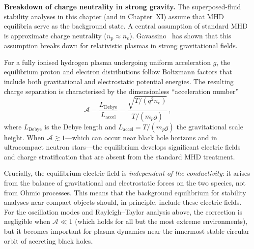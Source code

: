 \begin{relcorrection}
\textbf{Breakdown of charge neutrality in strong gravity.}
The superposed-fluid stability analyses in this chapter (and in
Chapter~XI) assume that MHD equilibria serve as the background state.
A central assumption of standard MHD is approximate charge neutrality
($n_p \approx n_e$).  Gavassino~\cite{GavassinoChargeSeparation2025}
has shown that this assumption breaks down for relativistic plasmas
in strong gravitational fields.

For a fully ionised hydrogen plasma undergoing uniform acceleration
$g$, the equilibrium proton and electron distributions follow
Boltzmann factors that include both gravitational and electrostatic
potential energies.  The resulting charge separation is characterised
by the dimensionless ``acceleration number''
\begin{equation}
  \mathscr{A} = \frac{L_{\mathrm{Debye}}}{L_{\mathrm{accel}}}
  = \frac{\sqrt{T/(q^2 n_e)}}{T/(m_p g)}\,,
  \label{eq:rel-10-accel-number}
\end{equation}
where $L_{\mathrm{Debye}}$ is the Debye length and
$L_{\mathrm{accel}} = T/(m_p g)$ the gravitational scale height.
When $\mathscr{A} \gtrsim 1$---which can occur near black hole
horizons and in ultracompact neutron stars---the equilibrium develops
significant electric fields and charge stratification that are
absent from the standard MHD treatment.

Crucially, the equilibrium electric field is \emph{independent of
the conductivity}: it arises from the balance of gravitational and
electrostatic forces on the two species, not from Ohmic processes.
This means that the background equilibrium for stability analyses
near compact objects should, in principle, include these electric
fields.  For the oscillation modes and Rayleigh--Taylor analysis
above, the correction is negligible when $\mathscr{A} \ll 1$
(which holds for all but the most extreme environments), but it
becomes important for plasma dynamics near the innermost stable
circular orbit of accreting black holes.
\end{relcorrection}
